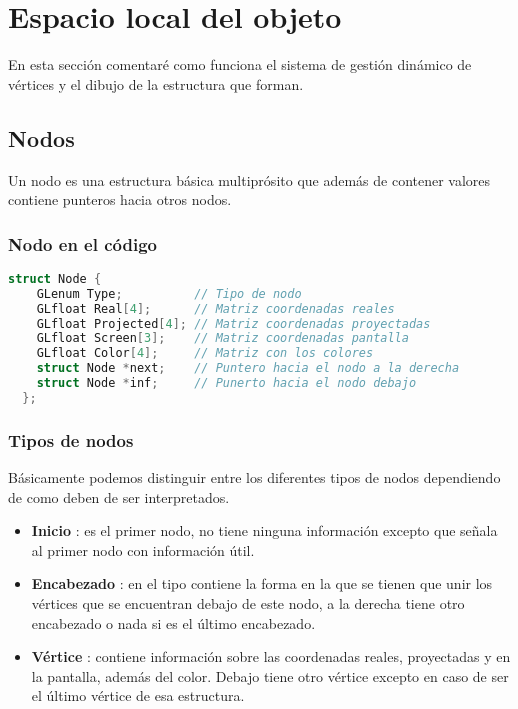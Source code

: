 \chapter{Espacio local del objeto}
En esta sección comentaré como funciona el sistema de gestión dinámico de vértices y el dibujo de la estructura que forman.
\section{Nodos}
Un nodo es una estructura básica multiprósito que además de contener valores contiene punteros hacia otros nodos.
\subsection{Nodo en el código}
\begin{lstlisting}[language=C]
  struct Node {
    GLenum Type;          // Tipo de nodo
    GLfloat Real[4];      // Matriz coordenadas reales
    GLfloat Projected[4]; // Matriz coordenadas proyectadas
    GLfloat Screen[3];    // Matriz coordenadas pantalla
    GLfloat Color[4];     // Matriz con los colores
    struct Node *next;    // Puntero hacia el nodo a la derecha  
    struct Node *inf;     // Punerto hacia el nodo debajo
  };
\end{lstlisting}
\subsection{Tipos de nodos}
Básicamente podemos distinguir entre los diferentes tipos de nodos dependiendo de como deben de ser interpretados.
\begin{itemize}
\item{\textbf{Inicio} : es el primer nodo, no tiene ninguna información excepto que señala al primer nodo con información útil.}
\item{\textbf{Encabezado} : en el tipo contiene la forma en la que se tienen que unir los vértices que se encuentran debajo de este nodo, a la derecha tiene otro encabezado o nada si es el último encabezado.}
  \item{\textbf{Vértice} : contiene información sobre las coordenadas reales, proyectadas y en la pantalla, además del color. Debajo tiene otro vértice excepto en caso de ser el último vértice de esa estructura.}
\end{itemize}

